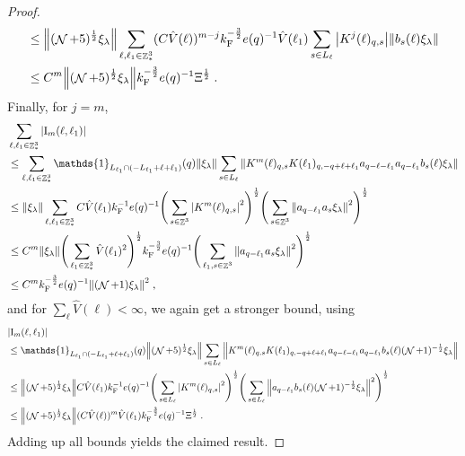\documentclass[12pt,a4paper]{article}
\numberwithin{equation}{section}
\newcommand{\1}{\mathbb{I}}
\newcommand{\F}{\mathrm{F}}
\newcommand{\I}{\mathrm{I}}
\DeclareMathOperator{\Z}{\mathbb{Z}}
\DeclareMathOperator{\NN}{\mathcal{N}}
\newcommand{\half}{\frac{1}{2}}
\theoremstyle{plain}
\theoremstyle{definition}
\theoremstyle{remark}
\theoremstyle{plain}
\theoremstyle{definition}
\theoremstyle{remark}
\begin{document}
\begin{proof}
\begin{align}
	&\leq \norm{ (\NN+5)^{\half} \xi_\lambda}
		\sum_{\ell,\ell_1 \in \Z^3_*} (C \hat{V}(\ell))^{m-j} k_{\F}^{-\frac 32} e(q)^{-1}
		\hat{V}(\ell_1)
		\sum\limits_{s\in L_{\ell}}\abs{K^{j}(\ell)_{q,s}}
		\norm{b_{s}(\ell) \xi_\lambda }		
	\nonumber\\
	&\leq C^m \norm{(\NN+5)^\half \xi_\lambda }
		k_{\F}^{-\frac 32} e(q)^{-1} \Xi^\half \;.
\end{align}
Finally, for $ j = m $,
\textcolor{green!30!black}{
\begin{align}
	&\sum_{\ell,\ell_1 \in \Z^3_*} |\I_m(\ell, \ell_1)| \nonumber\\
	&\leq \sum_{\ell,\ell_1 \in \Z^3_*} \mathds{1}_{L_{\ell_1} \cap (-L_{\ell_1} + \ell + \ell_1)}(q) \norm{\xi_\lambda}
		\sum\limits_{s \in L_{\ell}}
		\norm{ K^m(\ell)_{q,s} K(\ell_1)_{q,-q+\ell+\ell_1} a_{q-\ell-\ell_1} a_{q-\ell_1} b_{s}(\ell) \xi_\lambda } \nonumber\\
	&\leq \norm{\xi_\lambda}
		\sum_{\ell,\ell_1 \in \Z^3_*} C \hat{V}(\ell_1) k_{\F}^{-1} e(q)^{-1}
		\Bigg( \sum\limits_{s \in \Z^3} \abs{K^m(\ell)_{q,s}}^2\Bigg)^\half \Bigg(\sum\limits_{s \in \Z^3} \norm{ a_{q-\ell_1} a_s \xi_\lambda }^2\Bigg)^\half \nonumber\\
	&\leq C^m \norm{\xi_\lambda }
		\Bigg( \sum_{\ell_1 \in \Z^3_*} \hat{V}(\ell_1)^2 \Bigg)^{\half}
		k_{\F}^{-\frac 32} e(q)^{-1}
		\Bigg(\sum\limits_{\ell_1,s \in \Z^3} \norm{ a_{q-\ell_1} a_s \xi_\lambda }^2\Bigg)^\half \nonumber\\
	&\leq C^m k_{\F}^{-\frac 32} e(q)^{-1} \norm{(\NN+1) \xi_\lambda }^2 \;,
\end{align}
and for $ \sum_{\ell} \hat{V}(\ell) < \infty $, we again get a stronger bound, using
}
\begin{align}
	&|\I_m(\ell, \ell_1)| \nonumber\\
	&\leq \mathds{1}_{L_{\ell_1} \cap (-L_{\ell_1} + \ell + \ell_1)}(q) \norm{(\NN+5)^{\half} \xi_\lambda}
		\sum\limits_{s \in L_{\ell}}
		\norm{ K^m(\ell)_{q,s} K(\ell_1)_{q,-q+\ell+\ell_1} a_{q-\ell-\ell_1} a_{q-\ell_1} b_{s}(\ell) (\NN+1)^{-\half} \xi_\lambda } \nonumber\\
	&\leq \norm{(\NN+5)^{\half} \xi_\lambda}
		C \hat{V}(\ell_1) k_{\F}^{-1} e(q)^{-1}
		\Bigg( \sum\limits_{s \in L_{\ell}} \abs{K^m(\ell)_{q,s}}^2\Bigg)^\half \Bigg(\sum\limits_{s \in L_{\ell}} \norm{ a_{q-\ell_1} b_s(\ell) (\NN+1)^{-\half} \xi_\lambda }^2\Bigg)^\half \nonumber\\
	&\leq \norm{(\NN+5)^\half \xi_\lambda }
		(C \hat{V}(\ell))^m
		\hat{V}(\ell_1)
		k_{\F}^{-\frac 32} e(q)^{-1} \Xi^\half \;. \label{eq:estEQ1123}
\end{align}
Adding up all bounds yields the claimed result.
\end{proof}
\end{document}
